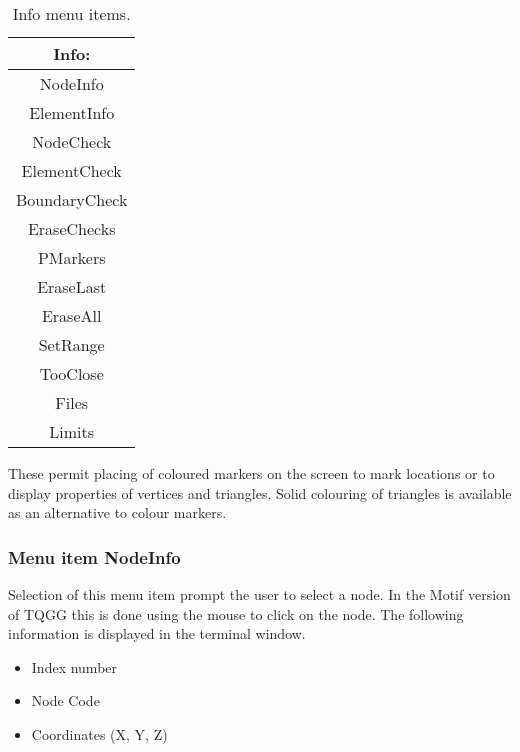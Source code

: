 \documentclass{article}
\begin{document}
\begin{table}[htb!]
 \caption{Info menu items.}
  \begin{center}
   \begin{tabular}{|c|}
    \hline
Info:\\     \hline
NodeInfo \\ ElementInfo \\     \hline
NodeCheck \\ ElementCheck \\ BoundaryCheck \\ EraseChecks \\     \hline
PMarkers \\ EraseLast \\ EraseAll \\     \hline
SetRange \\ TooClose \\     \hline
Files \\ Limits \\
    \hline
   \end{tabular}
   \label{tab:INFO}
  \end{center}
\end{table}

These permit placing of coloured markers on the screen to mark locations or to display properties of vertices and triangles. Solid colouring of triangles is available as an alternative to colour markers.


\subsubsection{Menu item NodeInfo}
Selection of this menu item prompt the user to select a node.  In the Motif version of TQGG this is done using the mouse to click on the node.  The following information is displayed in the terminal window.

\begin{itemize}
\item Index number
\item Node Code
\item Coordinates (X, Y, Z)
\end{itemize}
\end{document}
